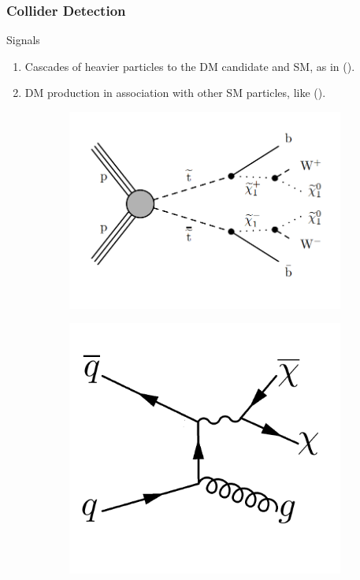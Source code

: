 \documentclass{beamer}
\begin{document}
\begin{frame}
\frametitle{Collider Detection}

\begin{alertblock}{Signals}
\begin{enumerate}
\item Cascades of heavier particles to the DM candidate and SM, as in ().
\item DM production in association with other SM particles,    like ().
\end{enumerate}
\end{alertblock}

\begin{figure}[!h]

\begin{subfigure}[b]{0.44\textwidth}
\centering
\includegraphics[width=\textwidth]{pictures/Cascade}
\caption{}
\label{Cascade}
\end{subfigure}
\begin{subfigure}[b]{0.44\textwidth}
\centering
\includegraphics[scale=0.3]{pictures/DirectProduction}
\caption{}
\label{DirectProduction}
\end{subfigure}


\end{figure}
\end{frame}
\end{document}
